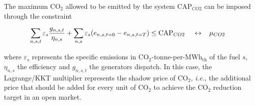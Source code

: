 \documentclass[3p]{elsarticle} %
\def\th{${}_{\textrm{th}}$}
\begin{document}
The maximum CO$_2$ allowed to be emitted by the system $\textrm{CAP}_{CO2}$ can be imposed through the constraint 

\begin{equation}
  \sum_{n,s,t}  \varepsilon_{s} \frac{ g_{n,s,t} }{\eta_{n,s}} + \sum_{n,s} \varepsilon_{s} (e_{n,s,t=0} - e_{n,s,t=T})  \leq  \textrm{CAP}_{CO2} \hspace{.4cm} \leftrightarrow \hspace{0.3cm} \mu_{CO2} \label{eq_co2cap}
\end{equation}

where $\varepsilon_{s}$ represents the specific emissions in CO$_2$-tonne-per-MWh\th{} of the fuel $s$, $\eta_{n,s}$ the efficiency and $g_{n,s,t}$ the generators dispatch. In this case, the Lagrange/KKT multiplier represents the shadow price of CO$_2$, \textit{i.e.}, the additional price that should be added for every unit of CO$_2$ to achieve the CO$_2$ reduction target in an open market. 
\end{document}
